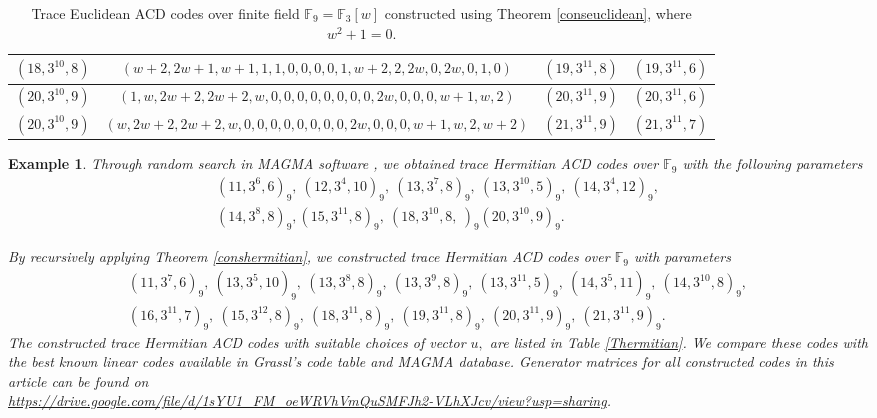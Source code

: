 \documentclass[sn-mathphys-num]{sn-jnl}%
\theoremstyle{thmstyleone}%
\theoremstyle{thmstyletwo}%
\newtheorem{example}{Example}%
\theoremstyle{thmstylethree}%
\begin{document}
\begin{table}[h!]
\begin{center}
\begin{adjustbox}{width=\textwidth}
\begin{tabular}{|c|c|c|c|}
				\hline
				$(18,3^{10},8)$&$(w+2,2w+1,w+1,1,1,0,0,0,0,1,w+2,2,2w,0,2w,0,1,0)$&$(19,3^{11},8)$& $(19,3^{11},6)$\\
				\hline
				$(20,3^{10},9)$&$(1,w,2w+2,2w+2,w,0,0,0,0,0,0,0,0,2w,0,0,0,w+1,w,2)$&$(20,3^{11},9)$& $(20,3^{11},6)$\\
				\hline
				$(20,3^{10},9)$&$(w,2w+2,2w+2,w,0,0,0,0,0,0,0,0,2w,0,0,0,w+1,w,2,w+2)$&$(21,3^{11},9)$& $(21,3^{11},7)$\\
				\hline
			\end{tabular}
		\end{adjustbox}
	\end{center}
\caption{Trace Euclidean ACD codes over finite field $\mathbb{F}_9=\mathbb{F}_3[w]$ constructed using Theorem \ref{conseuclidean}, where $w^2+1=0.$  \label{teuclidean}}
\end{table}

\begin{example}
	Through random search in  MAGMA software \cite{magma}, we obtained trace Hermitian ACD codes over $\mathbb{F}_9$ with the following parameters
	\begin{align*}
		(11,3^6,6)_9,\ (12,3^4,10)_9,\  (13,3^{7},8)_9,\ (13,3^{10},5)_9,\ (14,3^{4},12)_9,\\ (14,3^{8},8)_9,  (15,3^{11},8)_9,\ (18,3^{10},8,\ )_9 (20,3^{10},9)_9.
	\end{align*}
	
	By recursively applying Theorem \ref{conshermitian}, we constructed trace Hermitian ACD codes over $\mathbb{F}_9$ with parameters
	\begin{align*}
		(11,3^{7},6)_9,\ 	(13,3^{5},10)_9,\ 	(13,3^{8},8)_9,\ 	(13,3^{9},8)_9,\ 	(13,3^{11},5)_9,\ 	(14,3^{5},11)_9,\ 	(14,3^{10},8)_9,\\ 	(16,3^{11},7)_9,\ 	(15,3^{12},8)_9,\ 	(18,3^{11},8)_9,\ 	(19,3^{11},8)_9,\ 	(20,3^{11},9)_9,\ 	(21,3^{11},9)_9.
	\end{align*}
	The constructed trace Hermitian ACD codes with suitable choices of vector $u,$ are listed in Table \ref{Thermitian}.  We compare these codes with the best known linear codes available in Grassl's code table \cite{codetable} and MAGMA \cite{magma} database. Generator matrices for all constructed codes in this article can be found on\\   \small \href{https://drive.google.com/file/d/1sYU1_FM_oeWRVhVmQuSMFJh2-VLhXJcv/view?usp=sharing}{https://drive.google.com/file/d/1sYU1\_FM\_oeWRVhVmQuSMFJh2-VLhXJcv/view?usp=sharing}. 
\end{example}
\end{document}
